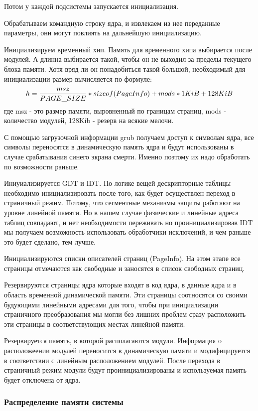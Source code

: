 Потом у каждой подсистемы запускается инициализация.

Обрабатываем командную строку ядра, и извлекаем из нее переданные параметры, они
могут повлиять на дальнейшую инициализацию.

Инициализируем временный хип. Память для временного хипа выбирается после
модулей. А длинна выбирается такой, чтобы он не выходил за пределы текущего
блока памяти. Хотя вряд ли он понадобиться такой большой, необходимый для
инициализации размер вычисляется по формуле:
$$h = {msz \over PAGE\_SIZE} * sizeof(PageInfo) + mods * 1KiB + 128KiB$$
где msz - это размер памяти, выровненный по границам страниц, mods - количество
модулей, 128Kib - резерв на всякие мелочи.

С помощью загрузочной информации grub получаем доступ к символам ядра, все
символы переносятся в динамическую память ядра и будут использованы в случае
срабатывания синего экрана смерти. Именно поэтому их надо обработать по
возможности раньше.

Иниуиализируется GDT и IDT. По логике вещей дескрипторные таблицы необходимо
инициализировать после того, как будет осуществлен переход в страничный режим.
Потому, что сегментные механизмы защиты работают на уровне линейной памяти. Но в
нашем случае физические и линейные адреса таблиц совпадают, и нет необходимости
переживать но проинициализировав IDT мы получаем возможность использовать
обработчики исключений, и чем раньше это будет сделано, тем лучше.

Инициализируются списки описателей страниц (PageInfo). На этом этапе все
страницы отмечаются как свободные и заносятся в список свободных страниц.

Резервируются страницы ядра которые входят в код ядра, в данные ядра и в область
временной динамической памяти. Эти страницы соотносятся со своими будующими
линейными адресами для того, чтобы при инициализации страничного преобразования
мы могли без лишних проблем сразу расположить эти страницы в соответствующих
местах линейной памяти.

Резервируется память, в которой располагаются модули. Информация о расположеении
модулей переносится в динамическую памяти и модифицируется в соответствии с
линейным расположением модулей. После перехода в страничный режим модули будут проинициализированы и используемая память будет отключена от ядра.


\subsubsection{Распределение памяти системы}


